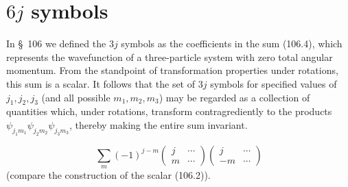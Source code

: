 \section{$6j$ symbols}

In \S~106 we defined the $3j$ symbols as the coefficients in the sum (106.4), which represents the wavefunction of a three-particle system with zero total angular momentum. From the standpoint of transformation properties under rotations, this sum is a scalar. It follows that the set of $3j$ symbols for specified values of $j_1,j_2,j_3$ (and all possible $m_1,m_2,m_3$) may be regarded as a collection of quantities which, under rotations, transform contragrediently to the products $\psi_{j_1m_1}\psi_{j_2m_2}\psi_{j_3m_3}$, thereby making the entire sum invariant.


\begin{equation}
 \sum_m(-1)^{j-m}
 \begin{pmatrix}j&\cdots\\m&\cdots\end{pmatrix}
 \begin{pmatrix}j&\cdots\\-m&\cdots\end{pmatrix}
 \tag{108.1}
\end{equation}
(compare the construction of the scalar (106.2)).

